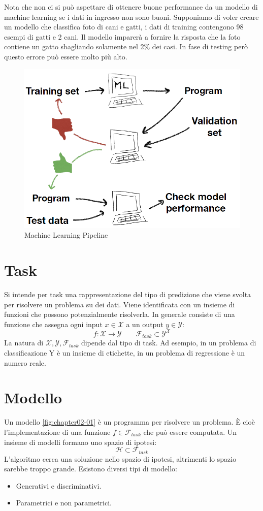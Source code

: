 Nota che non ci si può aspettare di ottenere buone performance da un modello di machine learning se i dati in ingresso non sono buoni. Supponiamo di voler creare un modello che classifica foto di cani e gatti, i dati di training contengono 98 esempi di gatti e 2 cani. Il modello imparerà a fornire la risposta che la foto contiene un gatto sbagliando solamente nel 2\% dei casi. In fase di testing per\`o questo errore pu\`o essere molto pi\`u alto.
\begin{figure}
	\centering
	\includegraphics[width=0.4\linewidth]{imgs/chapter2/img0}
	\caption{Machine Learning Pipeline}
	\label{fig:chapter02-00}
\end{figure}
\section{Task}
Si intende per task una rappresentazione del tipo di predizione che viene svolta per risolvere un problema su dei dati.
Viene identificata con un insieme di funzioni che possono potenzialmente risolverla.
In generale consiste di una funzione che assegna ogni input $x\in\mathcal{X}$ a un output $y\in\mathcal{Y}$:
$$f:\mathcal{X}\rightarrow\mathcal{Y}\qquad\mathcal{F}_{task}\subset\mathcal{Y^X}$$
La natura di $\mathcal{X},\mathcal{Y}, \mathcal{F}_{task}$ dipende dal tipo di task. Ad esempio, in un problema di classificazione Y è un insieme di etichette, in un problema di regressione è un numero reale.

\section{Modello}
Un modello \ref{fig:chapter02-01} \`e un programma per risolvere un problema.
\`E cio\`e l'implementazione di una funzione $f\in\mathcal{F}_{task}$ che pu\`o essere computata.
Un insieme di modelli formano uno spazio di ipotesi:
$$\mathcal{H}\subset\mathcal{F}_{task}$$
L'algoritmo cerca una soluzione nello spazio di ipotesi, altrimenti lo spazio sarebbe troppo grande.
Esistono diversi tipi di modello:
\begin{multicols}{2}
	\begin{itemize}
		\item Generativi e discriminativi.
		\item Parametrici e non parametrici.
	\end{itemize}
\end{multicols}

